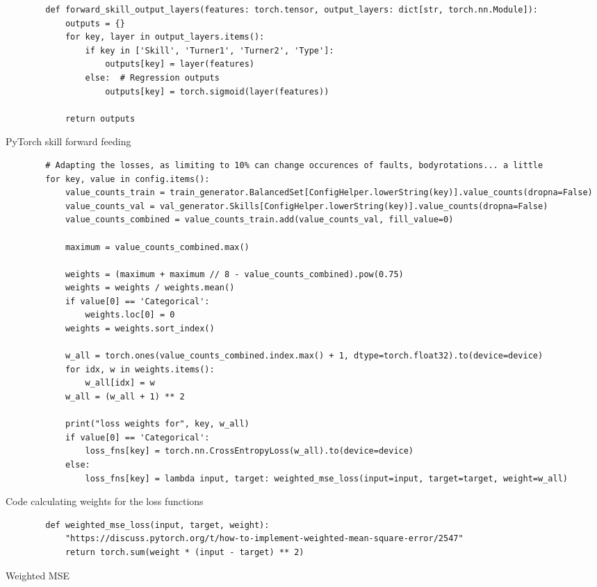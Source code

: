 \begin{listing}
    \begin{verbatim}
        def forward_skill_output_layers(features: torch.tensor, output_layers: dict[str, torch.nn.Module]):
            outputs = {}
            for key, layer in output_layers.items():
                if key in ['Skill', 'Turner1', 'Turner2', 'Type']:
                    outputs[key] = layer(features)
                else:  # Regression outputs
                    outputs[key] = torch.sigmoid(layer(features))
            
            return outputs
    \end{verbatim}
    \caption[Pytorch skill forward feed]{PyTorch skill forward feeding}
    \label{code:pytorch-skill-layers-forward}
\end{listing}

\begin{listing}
    \begin{verbatim}
        # Adapting the losses, as limiting to 10% can change occurences of faults, bodyrotations... a little
        for key, value in config.items():
            value_counts_train = train_generator.BalancedSet[ConfigHelper.lowerString(key)].value_counts(dropna=False)
            value_counts_val = val_generator.Skills[ConfigHelper.lowerString(key)].value_counts(dropna=False)
            value_counts_combined = value_counts_train.add(value_counts_val, fill_value=0)
        
            maximum = value_counts_combined.max()
        
            weights = (maximum + maximum // 8 - value_counts_combined).pow(0.75)
            weights = weights / weights.mean()
            if value[0] == 'Categorical':
                weights.loc[0] = 0
            weights = weights.sort_index()
        
            w_all = torch.ones(value_counts_combined.index.max() + 1, dtype=torch.float32).to(device=device)
            for idx, w in weights.items():
                w_all[idx] = w
            w_all = (w_all + 1) ** 2
        
            print("loss weights for", key, w_all)
            if value[0] == 'Categorical':
                loss_fns[key] = torch.nn.CrossEntropyLoss(w_all).to(device=device)
            else:
                loss_fns[key] = lambda input, target: weighted_mse_loss(input=input, target=target, weight=w_all)
    \end{verbatim}
    \caption[Code calculating weights for the loss functions]{Code calculating weights for the loss functions}
    \label{code:recognition-weighted-loss}
\end{listing}

\begin{listing}
    \begin{verbatim}
        def weighted_mse_loss(input, target, weight):
            "https://discuss.pytorch.org/t/how-to-implement-weighted-mean-square-error/2547"
            return torch.sum(weight * (input - target) ** 2)
    \end{verbatim}
    \caption[Weihted MSE]{Weighted MSE}
    \label{code:weighted-mse}
\end{listing}

